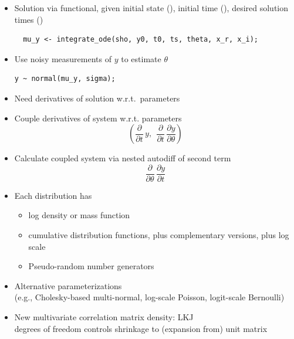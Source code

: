 \documentclass[10pt]{report}
\begin{document}
\begin{itemize}
\item Solution via functional, given initial state (), 
initial time (), desired solution times ()
{\footnotesize
\begin{Verbatim}
  mu_y <- integrate_ode(sho, y0, t0, ts, theta, x_r, x_i);
\end{Verbatim}
}
\item Use noisy measurements of $y$ to estimate $\theta$
\begin{Verbatim}
y ~ normal(mu_y, sigma);
\end{Verbatim}
\end{itemize}

\begin{itemize}
\item Need derivatives of solution w.r.t.\ parameters
\item Couple derivatives of system  w.r.t. parameters
\[
\left( 
\frac{\partial}{\partial t} \, y, \ \
\frac{\partial}{\partial t} \, \frac{\partial y}{\partial \theta}
\right)
\]
\item Calculate coupled system via nested autodiff of second term
\[
\frac{\partial}{\partial \theta}
\,
\frac{\partial y}{\partial t}
\]
\end{itemize}


\begin{itemize}
\item Each distribution has
  \vspace*{-4pt}
  \begin{itemize}\small
  \item log density or mass function
  \item cumulative distribution functions, plus complementary versions,
    plus log scale
  \item Pseudo-random number generators
  \end{itemize}
\item Alternative parameterizations
  \\
  {\footnotesize (e.g., Cholesky-based multi-normal,
    log-scale Poisson, logit-scale Bernoulli)}
\item New multivariate correlation matrix density: LKJ
  \\
  {\footnotesize degrees of freedom controls 
    shrinkage to (expansion from) unit matrix}
\end{itemize}
\end{document}
